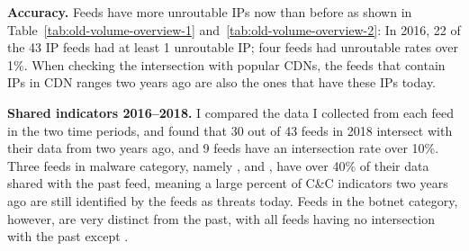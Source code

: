 \textbf{Accuracy.}
Feeds have more unroutable IPs now than before as shown in Table~\ref{tab:old-volume-overview-1} and~\ref{tab:old-volume-overview-2}:
In 2016, 22 of the 43 IP feeds had at least 1 unroutable IP; four feeds had unroutable rates over 1\%.
When checking the intersection with popular CDNs,
the feeds that contain IPs in CDN ranges two years ago are also the ones that have these IPs today.

\textbf{Shared indicators 2016--2018.}
I compared the data I collected from each feed in the two time periods, and found that 30
out of 43 feeds in 2018 intersect with their data from two years ago, and 9 feeds have
an intersection rate over 10\%. Three feeds in malware category, namely {\feedfeodo},
{\feedTSAbusech} and {\feedzeus}, have over 40\% of their data shared with the past feed,
meaning a large percent of C\&C indicators two years ago are still
identified by the feeds as threats today. Feeds in the botnet category, however, are very distinct from the
past, with all feeds having no intersection with the past except {\feedetiprep}.